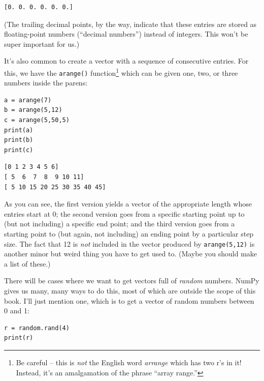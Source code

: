 \begin{Verbatim}[fontsize=\small,samepage=true,frame=leftline,framesep=5mm,framerule=1mm]
[0. 0. 0. 0. 0. 0.]
\end{Verbatim}

(The trailing decimal points, by the way, indicate that these entries are
stored as floating-point numbers (``decimal numbers'') instead of integers.
This won't be super important for us.)

\medskip
{}
\label{arange}

It's also common to create a vector with a sequence of consecutive entries. For
this, we have the \texttt{arange()} function\footnote{Be careful -- this is
\textit{not} the English word \textsl{arrange} which has two r's in it! Instead,
it's an amalgamation of the phrase ``array range.''} which can be given one,
two, or three numbers inside the parens:

\begin{Verbatim}[fontsize=\small,samepage=true,frame=single,framesep=3mm]
a = arange(7)
b = arange(5,12)
c = arange(5,50,5)
print(a)
print(b)
print(c)
\end{Verbatim}
\vspace{-.2in}

\begin{Verbatim}[fontsize=\small,samepage=true,frame=leftline,framesep=5mm,framerule=1mm]
[0 1 2 3 4 5 6]
[ 5  6  7  8  9 10 11]
[ 5 10 15 20 25 30 35 40 45]
\end{Verbatim}

As you can see, the first version yields a vector of the appropriate length
whose entries start at 0; the second version goes from a specific starting
point up to (but not including) a specific end point; and the third version
goes from a starting point to (but again, not including) an ending point by a
particular step size. The fact that 12 is \textit{not} included in the vector
produced by \texttt{arange(5,12)} is another minor but weird thing you have to
get used to. (Maybe you should make a list of these.)

\medskip
{}

There will be cases where we want to get vectors full of \textit{random}
numbers. NumPy gives us many, many ways to do this, most of which are outside
the scope of this book. I'll just mention one, which is to get a vector of
random numbers between 0 and 1:

\begin{Verbatim}[fontsize=\small,samepage=true,frame=single,framesep=3mm]
r = random.rand(4)
print(r)
\end{Verbatim}
\vspace{-.2in}

